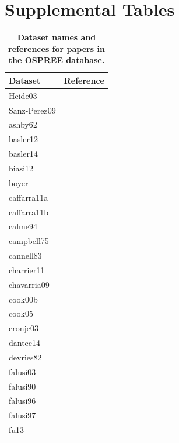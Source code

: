 \documentclass[11pt]{article}
\begin{document}
\section* {Supplemental Tables}
\begin{footnotesize} 

\begingroup\footnotesize
\begin{longtable}{p{}p{}}
\caption{\textbf{Dataset names and references for papers in the OSPREE database.}} \\ 
  \hline
Dataset & Reference \\ 
  \hline \endhead  \hline
Heide03 & \citep{Ashby:1962aa} \\ 
  Sanz-Perez09 & \citep{Basler:2012} \\ 
  ashby62 & \citep{Basler:2014aa} \\ 
  basler12 & \citep{Biasi:2012} \\ 
  basler14 & \citep{Boyer:1986} \\ 
  biasi12 & \citep{Caffarra:2011a} \\ 
  boyer & \citep{Caffarra:2011b} \\ 
  caffarra11a & \citep{Calme:1994aa} \\ 
  caffarra11b & \citep{Campbell:1975aa} \\ 
  calme94 & \citep{Cannell:1983} \\ 
  campbell75 & \citep{Charrier:2011aa} \\ 
  cannell83 & \citep{Chavarria:2009aa} \\ 
  charrier11 & \citep{Cook:2000aa} \\ 
  chavarria09 & \citep{Cook:2005aa} \\ 
  cook00b & \citep{Cronje:2003aa} \\ 
  cook05 & \citep{Dantec:2014aa} \\ 
  cronje03 & \citep{DeVries:1982aa} \\ 
  dantec14 & \citep{Falusi:2003aa} \\ 
  devries82 & \citep{Falusi:1990aa} \\ 
  falusi03 & \citep{Falusi:1996aa} \\ 
  falusi90 & \citep{Falusi:1997aa} \\ 
  falusi96 & \citep{Fu:2013aa} \\ 
  falusi97 & \citep{Gansert:2002aa} \\ 
  fu13 & \citep{Ghelardini:2010aa} \\ 

\end{longtable}
\end{footnotesize}
\end{document}
